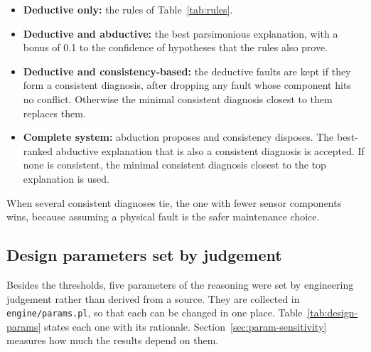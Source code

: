 \begin{itemize}
  \item \textbf{Deductive only:} the rules of Table~\ref{tab:rules}.
  \item \textbf{Deductive and abductive:} the best parsimonious explanation, with a bonus of 0.1 to the confidence of hypotheses that the rules also prove.
  \item \textbf{Deductive and consistency-based:} the deductive faults are kept if they form a consistent diagnosis, after dropping any fault whose component hits no conflict. Otherwise the minimal consistent diagnosis closest to them replaces them.
  \item \textbf{Complete system:} abduction proposes and consistency disposes. The best-ranked abductive explanation that is also a consistent diagnosis is accepted. If none is consistent, the minimal consistent diagnosis closest to the top explanation is used.
\end{itemize}
When several consistent diagnoses tie, the one with fewer sensor components wins, because assuming a physical fault is the safer maintenance choice.

\subsection{Design parameters set by judgement}
\label{sec:design-params}

Besides the thresholds, five parameters of the reasoning were set by engineering judgement rather than derived from a source. They are collected in \texttt{engine/params.pl}, so that each can be changed in one place. Table~\ref{tab:design-params} states each one with its rationale. Section~\ref{sec:param-sensitivity} measures how much the results depend on them.

